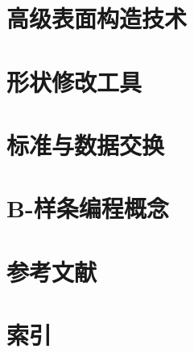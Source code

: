 \documentclass[zihao=false,linespread=1.5,heading=true,oneside,fontset=windows]{ctexbook}
\begin{document}
\chapter{高级表面构造技术}\label{sec:10}


\chapter{形状修改工具}\label{sec:11}


\chapter{标准与数据交换}\label{sec:12}


\chapter{B-样条编程概念}\label{sec:13}


\chapter{参考文献}\label{sec:14}


\chapter{索引}\label{sec:15}


\newpage
\thispagestyle{empty}%

\newpage
\end{document}
